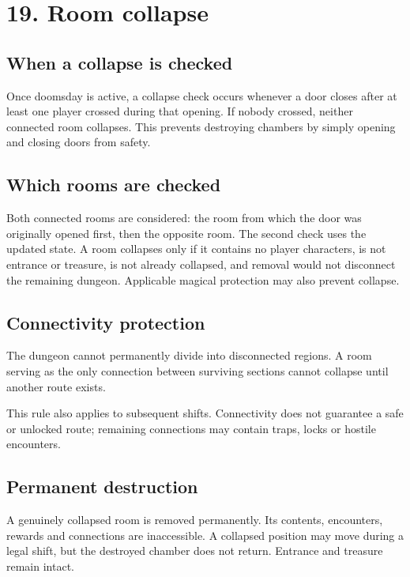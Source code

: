 \section{19. Room collapse}

\subsection{When a collapse is checked}

Once doomsday is active, a collapse check occurs whenever a door closes after at least one player crossed during that opening. If nobody crossed, neither connected room collapses. This prevents destroying chambers by simply opening and closing doors from safety.

\subsection{Which rooms are checked}

Both connected rooms are considered: the room from which the door was originally opened first, then the opposite room. The second check uses the updated state. A room collapses only if it contains no player characters, is not entrance or treasure, is not already collapsed, and removal would not disconnect the remaining dungeon. Applicable magical protection may also prevent collapse.

\subsection{Connectivity protection}

The dungeon cannot permanently divide into disconnected regions. A room serving as the only connection between surviving sections cannot collapse until another route exists.

\begin{center}\end{center}

This rule also applies to subsequent shifts. Connectivity does not guarantee a safe or unlocked route; remaining connections may contain traps, locks or hostile encounters.

\subsection{Permanent destruction}

A genuinely collapsed room is removed permanently. Its contents, encounters, rewards and connections are inaccessible. A collapsed position may move during a legal shift, but the destroyed chamber does not return. Entrance and treasure remain intact.

